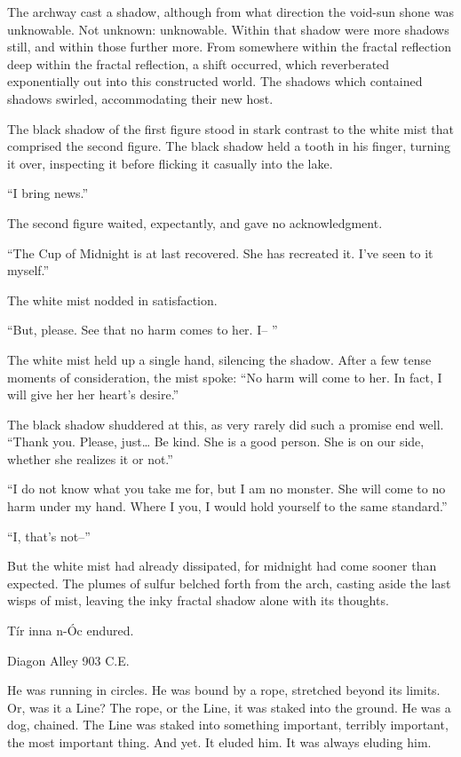 The archway cast a shadow, although from what direction the void-sun shone was unknowable. Not unknown: unknowable. Within that shadow were more shadows still, and within those further more. From somewhere within the fractal reflection deep within the fractal reflection, a shift occurred, which reverberated exponentially out into this constructed world. The shadows which contained shadows swirled, accommodating their new host.

The black shadow of the first figure stood in stark contrast to the white mist that comprised the second figure. The black shadow held a tooth in his finger, turning it over, inspecting it before flicking it casually into the lake.

“I bring news.”

The second figure waited, expectantly, and gave no acknowledgment.

“The Cup of Midnight is at last recovered. She has recreated it. I’ve seen to it myself.”

The white mist nodded in satisfaction.

“But, please. See that no harm comes to her. I– ”

The white mist held up a single hand, silencing the shadow. After a few tense moments of consideration, the mist spoke: “No harm will come to her. In fact, I will give her her heart’s desire.”

The black shadow shuddered at this, as very rarely did such a promise end well. “Thank you. Please, just… Be kind. She is a good person. She is on our side, whether she realizes it or not.”

“I do not know what you take me for, but I am no monster. She will come to no harm under my hand. Where I you, I would hold yourself to the same standard.”

“I, that’s not–”

But the white mist had already dissipated, for midnight had come sooner than expected. The plumes of sulfur belched forth from the arch, casting aside the last wisps of mist, leaving the inky fractal shadow alone with its thoughts.

Tír inna n-Óc endured.

\simpleline

Diagon Alley
903 C.E.

He was running in circles. He was bound by a rope, stretched beyond its limits. Or, was it a Line? The rope, or the Line, it was staked into the ground. He was a dog, chained. The Line was staked into something important, terribly important, the most important thing. And yet. It eluded him. It was always eluding him.

